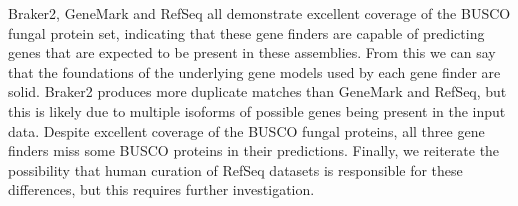 
Braker2, GeneMark and RefSeq all demonstrate excellent coverage of the
BUSCO fungal protein set, indicating that these gene finders are
capable of predicting genes that are expected to be present in these
assemblies. From this we can say that the foundations of the
underlying gene models used by each gene finder are solid. Braker2
produces more duplicate matches than GeneMark and RefSeq, but this is
likely due to multiple isoforms of possible genes being present in the
input data. Despite excellent coverage of the BUSCO fungal proteins,
all three gene finders miss some BUSCO proteins in their
predictions. 
Finally, we reiterate the possibility that human curation of RefSeq datasets is responsible for these differences, but this requires further investigation.
